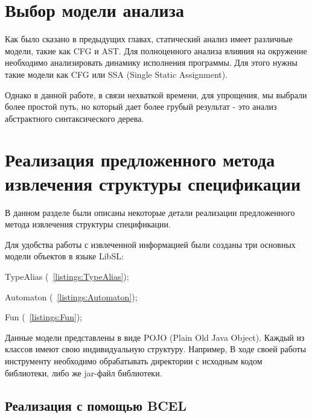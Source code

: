 \section{Выбор модели анализа}

Как было сказано в предыдущих главах, статический анализ имеет различные модели, такие как CFG и AST.
Для полноценного анализа влияния на окружение необходимо анализировать динамику исполнения программы.
Для этого нужны такие модели как CFG или SSA (Single Static Assignment).

Однако в данной работе, в связи нехваткой времени, для упрощения, мы выбрали более простой путь, но который дает более грубый результат - это анализ абстрактного синтаксического дерева.


\section{Реализация предложенного метода извлечения структуры спецификации}

В данном разделе были описаны некоторые детали реализации предложенного метода извлечения структуры спецификации.

Для удобства работы с извлеченной информацией были созданы три основных модели объектов в языке LibSL:
%
\begin{itemize*}
\item TypeAlias (~\ref{listings:TypeAlias});
\item Automaton (~\ref{listings:Automaton});
\item Fun (~\ref{listings:Fun});
\end{itemize*}
%

Данные модели представлены в виде POJO (Plain Old Java Object). Каждый из классов имеют свою индивидуальную структуру. Например,
В ходе своей работы инструменту необходимо обрабатывать директории с исходным кодом библиотеки, либо же jar-файл библиотеки.

\subsection{Реализация с помощью BCEL}

